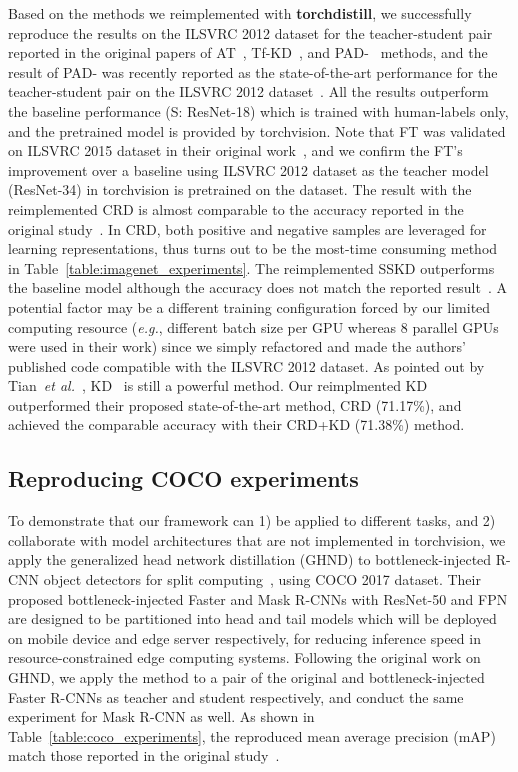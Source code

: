 \documentclass[runningheads]{llncs}
\newcommand{\FRAMEWORK}{{\bf torchdistill}\xspace}
\begin{document}
Based on the methods we reimplemented with \FRAMEWORK, we successfully reproduce the results on the ILSVRC 2012 dataset for the teacher-student pair reported in the original papers of AT~\cite{zagoruyko2017paying}, Tf-KD~\cite{yuan2020revisiting},  and PAD-~\cite{zhang2020prime} methods, and the result of PAD- was recently reported as the state-of-the-art performance for the teacher-student pair on the ILSVRC 2012 dataset~\cite{zhang2020prime}.
All the results outperform the baseline performance (S: ResNet-18) which is trained with human-labels only, and the pretrained model is provided by torchvision.
Note that FT was validated on ILSVRC 2015 dataset in their original work~\cite{kim2018paraphrasing}, and we confirm the FT's improvement over a baseline using ILSVRC 2012 dataset as the teacher model (ResNet-34) in torchvision is pretrained on the dataset.
The result with the reimplemented CRD is almost comparable to the accuracy reported in the original study~\cite{tian2020contrastive}.
In CRD, both positive and negative samples are leveraged for learning representations, thus turns out to be the most-time consuming method in Table~\ref{table:imagenet_experiments}.
The reimplemented SSKD outperforms the baseline model although the accuracy does not match the reported result~\cite{xu2020knowledge}.
A potential factor may be a different training configuration forced by our limited computing resource (\emph{e.g.}, different batch size per GPU whereas 8 parallel GPUs were used in their work) since we simply refactored and made the authors' published code compatible with the ILSVRC 2012 dataset.
As pointed out by Tian~\emph{et al.}~\cite{tian2020contrastive}, KD~\cite{hinton14distilling} is still a powerful method.
Our reimplmented KD outperformed their proposed state-of-the-art method, CRD (71.17\%), and achieved the comparable accuracy with their CRD+KD (71.38\%) method.


\subsection{Reproducing COCO experiments}
\label{subsec:coco_experiments}
To demonstrate that our framework can 1) be applied to different tasks, and 2) collaborate with model architectures that are not implemented in torchvision, we apply the generalized head network distillation (GHND) to bottleneck-injected R-CNN object detectors for split computing~\cite{matsubara2020neural}, using COCO 2017 dataset.
Their proposed bottleneck-injected Faster and Mask R-CNNs with ResNet-50 and FPN are designed to be partitioned into head and tail models which will be deployed on mobile device and edge server respectively, for reducing inference speed in resource-constrained edge computing systems.
Following the original work on GHND, we apply the method to a pair of the original and bottleneck-injected Faster R-CNNs as teacher and student respectively, and conduct the same experiment for Mask R-CNN as well.
As shown in Table~\ref{table:coco_experiments}, the reproduced mean average precision (mAP) match those reported in the original study~\cite{matsubara2020neural}.
\end{document}
